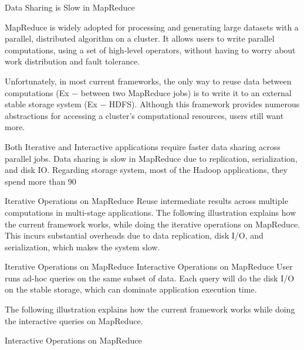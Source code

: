 Data Sharing is Slow in MapReduce


MapReduce is widely adopted for processing and generating large datasets with a parallel, distributed algorithm on a cluster. It allows users to write parallel computations, using a set of high-level operators, without having to worry about work distribution and fault tolerance.

Unfortunately, in most current frameworks, the only way to reuse data between computations (Ex − between two MapReduce jobs) is to write it to an external stable storage system (Ex − HDFS). Although this framework provides numerous abstractions for accessing a cluster’s computational resources, users still want more.

Both Iterative and Interactive applications require faster data sharing across parallel jobs. Data sharing is slow in MapReduce due to replication, serialization, and disk IO. Regarding storage system, most of the Hadoop applications, they spend more than 90%

Iterative Operations on MapReduce
Reuse intermediate results across multiple computations in multi-stage applications. The following illustration explains how the current framework works, while doing the iterative operations on MapReduce. This incurs substantial overheads due to data replication, disk I/O, and serialization, which makes the system slow.

Iterative Operations on MapReduce
Interactive Operations on MapReduce
User runs ad-hoc queries on the same subset of data. Each query will do the disk I/O on the stable storage, which can dominate application execution time.

The following illustration explains how the current framework works while doing the interactive queries on MapReduce.

Interactive Operations on MapReduce
